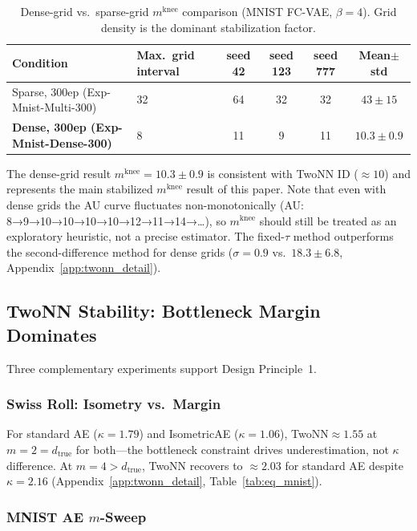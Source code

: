 \documentclass[make,article,submit,pdftex,moreauthors]{Definitions/mdpi}
\newcommand{\kap}{\kappa}
\newcommand{\mknee}{m^{\mathrm{knee}}}
\begin{document}
\begin{table}[ht]
\centering
\caption{Dense-grid vs.\ sparse-grid $\mknee$ comparison (MNIST FC-VAE, $\beta=4$).
Grid density is the dominant stabilization factor.}
\label{tab:el_mknee}
\small
\begin{tabularx}{\linewidth}{lXcccc}
\toprule
Condition & Max.\ grid interval & seed 42 & seed 123 & seed 777 & Mean$\pm$std \\
\midrule
Sparse, 300ep (Exp-Mnist-Multi-300) & 32 & 64 & 32 & 32 & $43\pm15$ \\
\textbf{Dense, 300ep (Exp-Mnist-Dense-300)} & 8 & 11 & 9 & 11 & $\boldsymbol{10.3\pm0.9}$ \\
\bottomrule
\end{tabularx}
\end{table}

The dense-grid result $\mknee=10.3\pm0.9$ is consistent with TwoNN ID
($\approx10$) and represents the main stabilized $\mknee$ result of this paper.
Note that even with dense grids the AU curve fluctuates non-monotonically
(AU: 8→9→10→10→10→10→12→11→14→\ldots), so $\mknee$ should still be
treated as an exploratory heuristic, not a precise estimator.
The fixed-$\tau$ method outperforms the second-difference method for dense grids
($\sigma=0.9$ vs.\ $18.3\pm6.8$, Appendix~\ref{app:twonn_detail}).

\subsection{TwoNN Stability: Bottleneck Margin Dominates}\label{sec:exp_stability}

Three complementary experiments support Design Principle~1.

\subsubsection{Swiss Roll: Isometry vs.\ Margin}

For standard AE ($\kap=1.79$) and IsometricAE ($\kap=1.06$), TwoNN$\approx1.55$
at $m=2=d_{\mathrm{true}}$ for both—the bottleneck constraint drives
underestimation, not $\kap$ difference.
At $m=4>d_{\mathrm{true}}$, TwoNN recovers to $\approx2.03$ for standard AE
despite $\kap=2.16$ (Appendix~\ref{app:twonn_detail}, Table~\ref{tab:eq_mnist}).

\subsubsection{MNIST AE $m$-Sweep}
\end{document}
